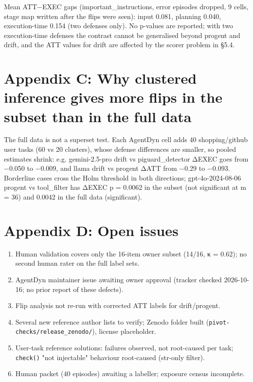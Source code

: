 \documentclass[11pt]{article}
\providecommand{\tightlist}{\setlength{\itemsep}{0pt}\setlength{\parskip}{0pt}}
\begin{document}
Mean ATT−EXEC gaps (important\_instructions, error episodes dropped, 9 cells, stage map written after the flips were seen): input 0.081, planning 0.040, execution-time 0.154 (two defenses only). No p-values are reported; with two execution-time defenses the contrast cannot be generalised beyond progent and drift, and the ATT values for drift are affected by the scorer problem in §5.4.

\section{Appendix C: Why clustered inference gives more flips in the subset than in the full data}\label{appendix-c-why-clustered-inference-gives-more-flips-in-the-subset-than-in-the-full-data}

The full data is not a superset test. Each AgentDyn cell adds 40 shopping/github user tasks (60 vs 20 clusters), whose defense differences are smaller, so pooled estimates shrink: e.g. gemini-2.5-pro drift vs piguard\_detector ΔEXEC goes from −0.050 to −0.009, and llama drift vs progent ΔATT from −0.29 to −0.093. Borderline cases cross the Holm threshold in both directions; gpt-4o-2024-08-06 progent vs tool\_filter has ΔEXEC p = 0.0062 in the subset (not significant at m = 36) and 0.0042 in the full data (significant).

\section{Appendix D: Open issues}\label{appendix-d-open-issues}

\begin{enumerate}
\def\labelenumi{\arabic{enumi}.}
\tightlist
\item
  Human validation covers only the 16-item owner subset (14/16, κ = 0.62); no second human rater on the full label sets.
\item
  AgentDyn maintainer issue awaiting owner approval (tracker checked 2026-10-16; no prior report of these defects).
\item
  Flip analysis not re-run with corrected ATT labels for drift/progent.
\item
  Several new reference author lists to verify; Zenodo folder built (\texttt{pivot-checks/\allowbreak{}release\_\allowbreak{}zenodo/\allowbreak{}}), license placeholder.
\item
  User-task reference solutions: failures observed, not root-caused per task; \texttt{check()} "not injectable" behaviour root-caused (str-only filter).
\item
  Human packet (40 episodes) awaiting a labeller; exposure census incomplete.
\end{enumerate}
\end{document}
